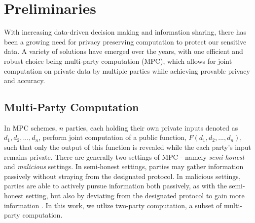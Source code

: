 \documentclass[9pt,sigconf,screen]{acmart}
\newcommand{\nojan}[1]{\textcolor{red}{{\sf (NS:} {\sl{#1})}}}
\begin{document}
\section{Preliminaries}\label{prelim}

With increasing data-driven decision making and information sharing, there has been a growing need for privacy preserving computation to protect our sensitive data. A variety of solutions have emerged over the years, with one efficient and robust choice being multi-party computation (MPC), which allows for joint computation on private data by multiple parties while achieving provable privacy and accuracy.

\subsection{Multi-Party Computation}\label{MPCSec}

In MPC schemes, $n$ parties, each holding their own private inputs denoted as ${d_1, d_2, ..., d_n}$, perform joint computation of a public function, $F(d_1, d_2, ..., d_n)$, such that only the output of this function is revealed while the each party's input remains private. There are generally two settings of MPC -  namely \textit{semi-honest} and \textit{malicious} settings. In semi-honest settings, parties may gather information passively without straying from the designated protocol. In malicious settings, parties are able to actively pursue information both passively, as with the semi-honest setting, but also by deviating from the designated protocol to gain more information \cite{introToMPC}. 
In this work, we utlize two-party computation, a subset of multi-party computation.
\end{document}
